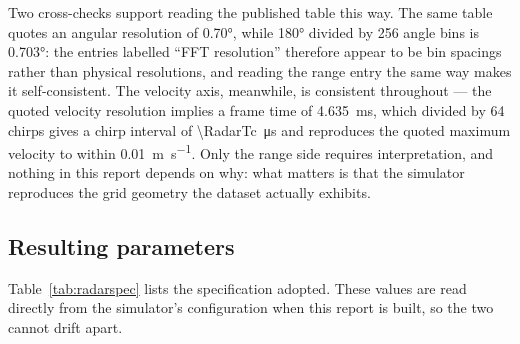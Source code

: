 Two cross-checks support reading the published table this way. The same table quotes an angular
resolution of \ang{0.70}, while \ang{180} divided by 256 angle bins is \ang{0.703}: the entries
labelled ``FFT resolution'' therefore appear to be bin spacings rather than physical resolutions, and
reading the range entry the same way makes it self-consistent. The velocity axis, meanwhile, is
consistent throughout --- the quoted velocity resolution implies a frame time of
\SI{4.635}{\milli\second}, which divided by 64 chirps gives a chirp interval of
\SI{\RadarTc}{\micro\second} and reproduces the quoted maximum velocity to within
\SI{0.01}{\metre\per\second}. Only the range side requires interpretation, and nothing in this report
depends on why: what matters is that the simulator reproduces the grid geometry the dataset actually
exhibits.

\subsection{Resulting parameters}

Table~\ref{tab:radarspec} lists the specification adopted. These values are read directly from the
simulator's configuration when this report is built, so the two cannot drift apart.

